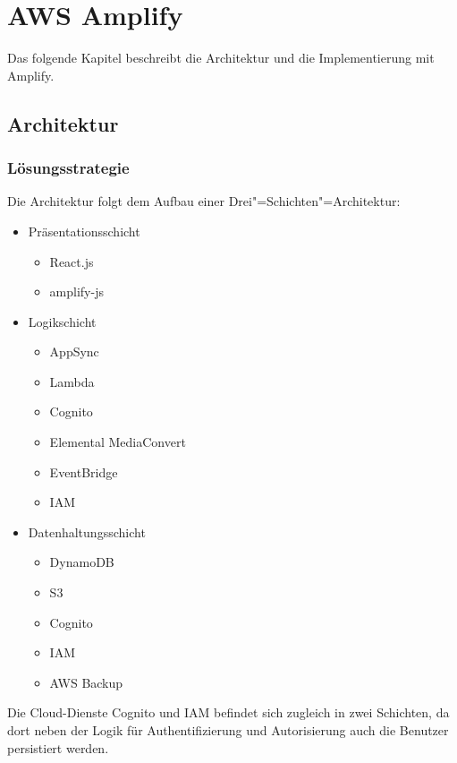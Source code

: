 \chapter{AWS Amplify}

Das folgende Kapitel beschreibt die Architektur und die Implementierung mit Amplify.

\section{Architektur}

\subsection{Lösungsstrategie}

Die Architektur folgt dem Aufbau einer Drei"=Schichten"=Architektur:

\begin{itemize}
  \item Präsentationsschicht
    \begin{itemize}
      \item React.js
      \item amplify-js
    \end{itemize}
  \item Logikschicht
    \begin{itemize}
      \item AppSync
      \item Lambda
      \item Cognito
      \item Elemental MediaConvert
      \item EventBridge
      \item IAM
    \end{itemize}
  \item Datenhaltungsschicht
    \begin{itemize}
      \item DynamoDB
      \item S3
      \item Cognito
      \item IAM
      \item AWS Backup
    \end{itemize}
\end{itemize}

Die Cloud-Dienste Cognito und IAM befindet sich zugleich in zwei Schichten, da dort neben der Logik für Authentifizierung und Autorisierung auch die Benutzer persistiert werden.

